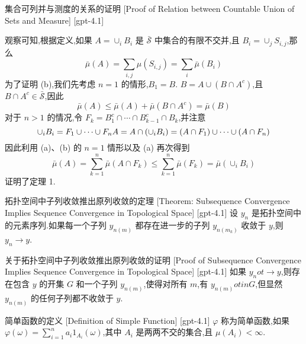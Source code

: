 \documentclass[UTF8]{ctexart}
\begin{document}
    \begin{prf}
        {集合可列并与测度的关系的证明}
        [Proof of Relation between Countable Union of Sets and Measure]
        [gpt-4.1]
        
观察可知,根据定义,如果 $A = \cup_{i} B_{i}$ 是 $\bar{\mathcal{S}}$ 中集合的有限不交并,且 $B_{i} = \cup_{j} S_{i,j}$,那么
\[
\bar{\mu}(A) = \sum_{i,j} \mu(S_{i,j}) = \sum_{i} \bar{\mu}(B_{i})
\]
为了证明 (b),我们先考虑 $n=1$ 的情形,$B_{1}=B$.
$B = A \cup (B \cap A^c)$,且 $B \cap A^c \in \bar{\mathcal{S}}$,因此
\[
\bar{\mu}(A) \leq \bar{\mu}(A) + \bar{\mu}(B \cap A^c) = \bar{\mu}(B)
\]
对于 $n>1$ 的情况,令 $F_{k} = B_{1}^{c} \cap \cdots \cap B_{k-1}^{c} \cap B_{k}$,并注意
\[
\cup_{i} B_{i} = F_{1} \cup \cdots \cup F_{n} \\
A = A \cap (\cup_{i} B_{i}) = (A \cap F_{1}) \cup \cdots \cup (A \cap F_{n})
\]
因此利用 (a)、(b) 的 $n=1$ 情形以及 (a) 再次得到
\[
\bar{\mu}(A) = \sum_{k=1}^{n} \bar{\mu}(A \cap F_{k}) \leq \sum_{k=1}^{n} \bar{\mu}(F_{k}) = \bar{\mu}\left(\cup_{i} B_{i}\right)
\]
证明了定理 1.

    \end{prf}
    
    
    
    \begin{thm}
        {拓扑空间中子列收敛推出原列收敛的定理}
        [Theorem: Subsequence Convergence Implies Sequence Convergence in Topological Space]
        [gpt-4.1]
        设 $y_{n}$ 是拓扑空间中的元素序列.如果每一个子列 $y_{n(m)}$ 都存在进一步的子列 $y_{n(m_{k})}$ 收敛于 $y$,则 $y_{n} \to y$.
    \end{thm}
    
    
    
    \begin{prf}
        {关于拓扑空间中子列收敛推出原列收敛的证明}
        [Proof of Subsequence Convergence Implies Sequence Convergence in Topological Space]
        [gpt-4.1]
        如果 $y_{n} 
ot\to y$,则存在包含 $y$ 的开集 $G$ 和一个子列 $y_{n(m)}$,使得对所有 $m$,有 $y_{n(m)} 
otin G$,但显然 $y_{n(m)}$ 的任何子列都不收敛于 $y$.
    \end{prf}
    
    
    
    \begin{dfn}
        {简单函数的定义}
        [Definition of Simple Function]
        [gpt-4.1]
        $\varphi$ 称为简单函数,如果 $\varphi(\omega) = \sum_{i=1}^n a_i 1_{A_i}(\omega)$,其中 $A_i$ 是两两不交的集合,且 $\mu(A_i) < \infty$.
    \end{dfn}
    
\end{document}

